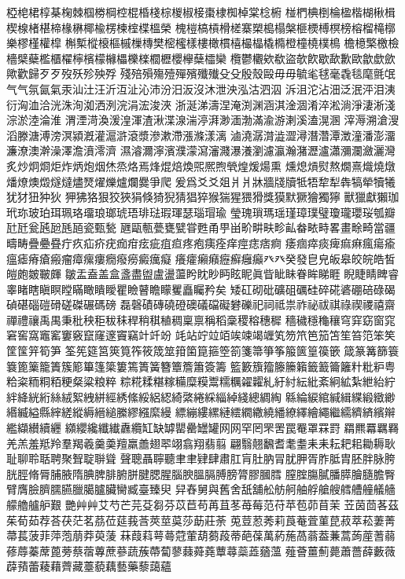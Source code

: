 椏梍桾椁棊椈棘椢椦棡椌棍棔棧棕椶椒椄棗棣椥棹棠棯椨
椪椚椣椡棆楹楷楜楸楫楔楾楮椹楴椽楙椰楡楞楝榁楪榲榮
槐榿槁槓榾槎寨槊槝榻槃榧樮榑榠榜榕榴槞槨樂樛槿權槹
槲槧樅榱樞槭樔槫樊樒櫁樣樓橄樌橲樶橸橇橢橙橦橈樸樢
檐檍檠檄檢檣檗蘗檻櫃櫂檸檳檬櫞櫑櫟檪櫚櫪櫻欅蘖櫺欒
欖鬱欟欸欷盜欹飮歇歃歉歐歙歔歛歟歡歸⽍歹歿殀殄殃殍
殘殕殞殤殪殫殯殲殱⽎殳殷殼毆⽏毋毓毟毬毫毳毯麾氈氓
⽓气氛氤氣汞汕汢汪沂沍沚沁沛汾汨汳沒沐泄泱泓沽泗泅
泝沮沱沾沺泛泯泙泪洟衍洶洫洽洸洙洵洳洒洌浣涓浤浚浹
浙涎涕濤涅淹渕渊涵淇淦涸淆淬淞淌淨淒淅淺淙淤淕淪淮
渭湮渮渙湲湟渾渣湫渫湶湍渟湃渺湎渤滿渝游溂溪溘滉溷
滓溽溯滄溲滔滕溏溥滂溟潁漑灌滬滸滾漿滲漱滯漲滌漾漓
滷澆潺潸澁澀潯潛濳潭澂潼潘澎澑濂潦澳澣澡澤澹濆澪濟
濕濬濔濘濱濮濛瀉瀋濺瀑瀁瀏濾瀛瀚潴瀝瀘瀟瀰瀾瀲灑灣
炙炒炯烱炬炸炳炮烟烋烝烙焉烽焜焙煥煕熈煦煢煌煖煬熏
燻熄熕熨熬燗熹熾燒燉燔燎燠燬燧燵燼燹燿爍爐爛爨爭爬
爰爲⽘爻爼⽙爿牀牆牋牘牴牾犂犁犇犒犖犢犧犹犲狃狆狄
狎狒狢狠狡狹狷倏猗猊猜猖猝猴猯猩猥猾獎獏默獗獪獨獰
獸獵獻獺珈玳珎玻珀珥珮珞璢琅瑯琥珸琲琺瑕琿瑟瑙瑁瑜
瑩瑰瑣瑪瑶瑾璋璞璧瓊瓏瓔珱瓠瓣瓧瓩瓮瓲瓰瓱瓸瓷甄甃
甅甌甎甍甕甓甞甦甬甼畄畍畊畉畛畆畚畩畤畧畫畭畸當疆
疇畴疊疉疂疔疚疝疥疣痂疳痃疵疽疸疼疱痍痊痒痙痣痞痾
痿痼瘁痰痺痲痳瘋瘍瘉瘟瘧瘠瘡瘢瘤瘴瘰瘻癇癈癆癜癘癡
癢癨癩癪癧癬癰癲⽨癶癸發皀皃皈皋皎皖皓皙皚皰皴皸皹
皺盂盍盖盒盞盡盥盧盪蘯盻眈眇眄眩眤眞眥眦眛眷眸睇睚
睨睫睛睥睿睾睹瞎瞋瞑瞠瞞瞰瞶瞹瞿瞼瞽瞻矇矍矗矚矜矣
矮矼砌砒礦砠礪硅碎硴碆硼碚碌碣碵碪碯磑磆磋磔碾碼磅
磊磬磧磚磽磴礇礒礑礙礬礫祀祠祗祟祚祕祓祺祿禊禝禧齋
禪禮禳禹禺秉秕秧秬秡秣稈稍稘稙稠稟禀稱稻稾稷穃穗穉
穡穢穩龝穰穹穽窈窗窕窘窖窩竈窰窶竅竄窿邃竇竊竍竏竕
竓站竚竝竡竢竦竭竰笂笏笊笆笳笘笙笞笵笨笶筐筺笄筍笋
筌筅筵筥筴筧筰筱筬筮箝箘箟箍箜箚箋箒箏筝箙篋篁篌篏
箴篆篝篩簑簔篦篥籠簀簇簓篳篷簗簍篶簣簧簪簟簷簫簽籌
籃籔籏籀籐籘籟籤籖籥籬籵粃粐粤粭粢粫粡粨粳粲粱粮粹
粽糀糅糂糘糒糜糢鬻糯糲糴糶糺紆紂紜紕紊絅絋紮紲紿紵
絆絳絖絎絲絨絮絏絣經綉絛綏絽綛綺綮綣綵緇綽綫總綢綯
緜綸綟綰緘緝緤緞緻緲緡縅縊縣縡縒縱縟縉縋縢繆繦縻縵
縹繃縷縲縺繧繝繖繞繙繚繹繪繩繼繻纃緕繽辮繿纈纉續纒
纐纓纔纖纎纛纜缸缺罅罌罍罎罐⽹网罕罔罘罟罠罨罩罧罸
羂羆羃羈羇羌羔羞羝羚羣羯羲羹羮羶羸譱翅翆翊翕翔翡翦
翩翳翹飜耆耄耋⽾耒耘耙耜耡耨耿耻聊聆聒聘聚聟聢聨聳
聲聰聶聹聽⾀聿肄肆肅肛肓肚肭冐肬胛胥胙胝胄胚胖脉胯
胱脛脩脣脯腋隋腆脾腓腑胼腱腮腥腦腴膃膈膊膀膂膠膕膤
膣腟膓膩膰膵膾膸膽臀臂膺臉臍臑臙臘臈臚臟臠臧臺臻臾
舁舂舅與舊舍舐舖舩舫舸舳艀艙艘艝艚艟艤艢艨艪艫舮艱
艷⾋艸艾芍芒芫芟芻芬苡苣苟苒苴苳苺莓范苻苹苞茆苜茉
苙茵茴茖茲茱荀茹荐荅茯茫茗茘莅莚莪莟莢莖茣莎莇莊荼
莵荳荵莠莉莨菴萓菫菎菽萃菘萋菁菷萇菠菲萍萢萠莽萸蔆
菻葭萪萼蕚蒄葷葫蒭葮蒂葩葆萬葯葹萵蓊葢蒹蒿蒟蓙蓍蒻
蓚蓐蓁蓆蓖蒡蔡蓿蓴蔗蔘蔬蔟蔕蔔蓼蕀蕣蕘蕈蕁蘂蕋蕕薀
薤薈薑薊薨蕭薔薛藪薇薜蕷蕾薐藉薺藏薹藐藕藝藥藜藹蘊
